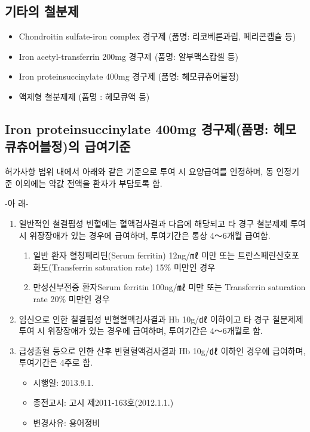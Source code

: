 \subsection{기타의 철분제}
\begin{itemize}\tightlist
\item Chondroitin sulfate-iron complex 경구제 (품명: 리코베론과립, 페리콘캡슐 등)
\item Iron acetyl-transferrin 200mg 경구제 (품명: 알부맥스캅셀 등) 
\item Iron proteinsuccinylate 400mg 경구제 (품명: 헤모큐츄어블정) 
\item 액제형 철분제제 (품명 : 헤모큐액 등) 
\end{itemize}
\prezi{\clearpage}
\subsection{Iron proteinsuccinylate 400mg 경구제(품명: 헤모큐츄어블정)의 급여기준}
허가사항 범위 내에서 아래와 같은 기준으로 투여 시 요양급여를 인정하며, 동 인정기준 이외에는 약값 전액을 환자가 부담토록 함.\par
-아 래-
\begin{enumerate}[가)]\tightlist
\item 일반적인 철결핍성 빈혈에는 혈액검사결과 다음에 해당되고 타 경구 철분제제 투여 시 위장장애가 있는 경우에 급여하며, 투여기간은 통상 4～6개월 급여함.
	\begin{enumerate}[1)]\tightlist
	\item 일반 환자 혈청페리틴(Serum ferritin) 12ng/㎖ 미만 또는 트란스페린산호포화도(Transferrin saturation rate) 15\% 미만인 경우 
	\item 만성신부전증 환자Serum ferritin 100ng/㎖ 미만 또는 Transferrin saturation rate 20\% 미만인 경우 
	\end{enumerate}
\item 임신으로 인한 철결핍성 빈혈혈액검사결과 Hb 10g/㎗ 이하이고 타 경구 철분제제 투여 시 위장장애가 있는 경우에 급여하며, 투여기간은 4～6개월로 함. 
\item 급성출혈 등으로 인한 산후 빈혈혈액검사결과 Hb 10g/㎗ 이하인 경우에 급여하며, 투여기간은 4주로 함.    
	\begin{itemize}[*]\tightlist
	\item 시행일: 2013.9.1.
	\item 종전고시: 고시 제2011-163호(2012.1.1.)
	\item 변경사유: 용어정비
	\end{itemize}
\end{enumerate}
\prezi{\clearpage}
